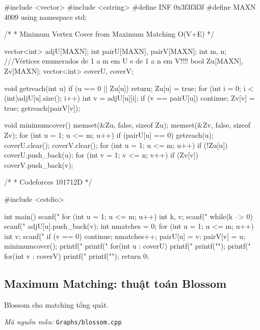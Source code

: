 \documentclass[11pt]{article}
\newcommand{\codepath}[1]{\par\noindent\textit{Mã nguồn mẫu:} \texttt{#1}\par}
\begin{document}
\begingroup\scriptsize
\begin{vncode}
#include <vector>
#include <cstring>
#define INF 0x3f3f3f3f
#define MAXN 4009
using namespace std;

/*
 * Minimum Vertex Cover from Maximum Matching O(V+E)
 */

vector<int> adjU[MAXN];
int pairU[MAXN], pairV[MAXN];
int m, n;
///Vértices enumerados de 1 a m em U e de 1 a n em V!!!!
bool Zu[MAXN], Zv[MAXN];
vector<int> coverU, coverV;

void getreach(int u) {
	if (u == 0 || Zu[u]) return;
	Zu[u] = true;
	for (int i = 0; i < (int)adjU[u].size(); i++) {
		int v = adjU[u][i];
		if (v == pairU[u]) continue;
		Zv[v] = true;
		getreach(pairV[v]);
	}
}

void minimumcover() {
	memset(&Zu, false, sizeof Zu);
	memset(&Zv, false, sizeof Zv);
	for (int u = 1; u <= m; u++)
		if (pairU[u] == 0) getreach(u);
	coverU.clear(); coverV.clear();
	for (int u = 1; u <= m; u++)
		if (!Zu[u]) coverU.push_back(u);
	for (int v = 1; v <= n; v++)
		if (Zv[v]) coverV.push_back(v);
}

/*
 * Codeforces 101712D
 */

#include <cstdio>

int main() {
	scanf("%
	for (int u = 1; u <= m; u++) {
		int k, v;
		scanf("%
		while(k --> 0) {
			scanf("%
			adjU[u].push_back(v);
		}
	}
	int nmatches = 0;
	for (int u = 1; u <= m; u++) {
		int v;
		scanf("%
		if (v == 0) continue;
		nmatches++;
		pairU[u] = v;
		pairV[v] = u;
	}
	minimumcover();
	printf("%
	printf("%
	for(int u : coverU) printf(" %
	printf("\n");
	printf("%
	for(int v : coverV) printf(" %
	printf("\n");
	return 0;
}
\end{vncode}
\endgroup


\subsection{Maximum Matching: thuật toán Blossom}

Blossom cho matching tổng quát.

\codepath{Graphs/blossom.cpp}
\end{document}
